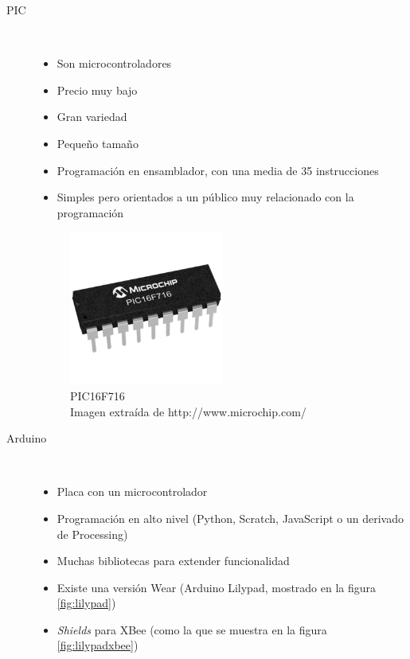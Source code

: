\begin{description}
  \item[PIC] \hfill \\
    \begin{itemize}
      \item Son microcontroladores
      \item Precio muy bajo
      \item Gran variedad
      \item Pequeño tamaño
      \item Programación en ensamblador, con una media de 35 instrucciones
      \item Simples pero orientados a un público muy relacionado con la programación
    \end{itemize}
    \begin{figure}[!htb]
    \centering
    \includegraphics[width=0.5\textwidth]{./imagenes/pic}
    \caption{PIC16F716\\  \scriptsize{Imagen extraída de http://www.microchip.com/}} \label{fig:pic}
    \end{figure}
  \item[Arduino] \hfill \\
    \begin{itemize}
      \item Placa con un microcontrolador
      \item Programación en alto nivel (Python, Scratch, JavaScript o un derivado de Processing)
      \item Muchas bibliotecas para extender funcionalidad
      \item Existe una versión Wear (Arduino Lilypad, mostrado en la figura \ref{fig:lilypad})
      \item \textit{Shields} para XBee (como la que se muestra en la figura \ref{fig:lilypadxbee})
    \end{itemize}
    \begin{figure}[!htb]

\end{figure}
\end{description}
